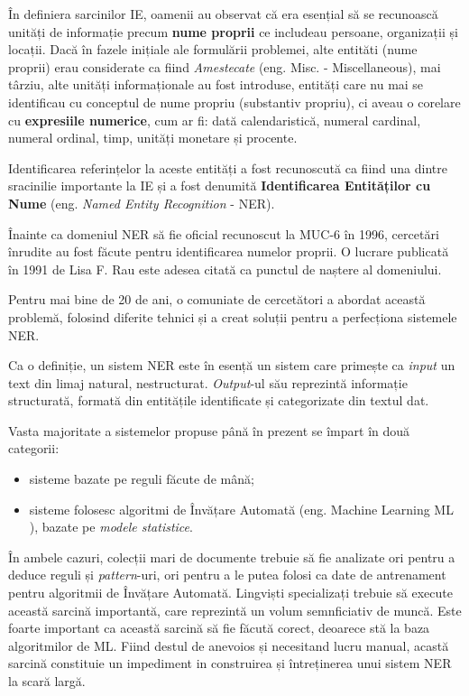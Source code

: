 În definiera sarcinilor IE, oamenii au observat că era esențial să se recunoască unități de informație precum \textbf{nume proprii} ce includeau persoane, organizații și locații. Dacă în fazele inițiale ale formulării problemei, alte entităti (nume proprii) erau considerate ca fiind \textit{Amestecate} (eng. Misc. - Miscellaneous), mai târziu, alte unități informaționale au fost introduse, entități care nu mai se identificau cu conceptul de nume propriu (substantiv propriu), ci aveau o corelare cu \textbf{expresiile numerice}, cum ar fi: dată calendaristică, numeral cardinal, numeral ordinal, timp, unități monetare și procente.


Identificarea referințelor la aceste entități a fost recunoscută ca fiind una dintre sracinilie importante la IE și a fost denumită \textbf{Identificarea Entităților cu Nume} (eng. \textit{Named Entity Recognition} - NER).


Înainte ca domeniul NER să fie oficial recunoscut la MUC-6 în 1996, cercetări înrudite au fost făcute pentru identificarea numelor proprii. O lucrare publicată în 1991 de Lisa F. Rau este adesea citată ca punctul de naștere al domeniului.\cite{rau1991}

Pentru mai bine de 20 de ani, o comuniate de cercetători a abordat această problemă, folosind diferite tehnici și a creat soluții pentru a perfecționa sistemele NER.

Ca o definiție, un sistem NER este în esență un sistem care primește ca \textit{input} un text din limaj natural, nestructurat. \textit{Output}-ul său reprezintă informație structurată, formată din entitățile identificate și categorizate din textul dat.

Vasta majoritate a sistemelor propuse până în prezent se împart în două categorii:

\begin{itemize}
\item sisteme bazate pe reguli făcute de mână;
\item sisteme folosesc algoritmi de Învățare Automată (eng. Machine Learning ML ), bazate pe \textit{modele statistice}.
\end{itemize}


În ambele cazuri, colecții mari de documente trebuie să fie analizate ori pentru a deduce reguli și \textit{pattern}-uri, ori pentru a le putea folosi ca date  de antrenament pentru algoritmii de Învățare Automată. Lingviști specializați trebuie să execute această sarcină importantă, care reprezintă un volum semnficiativ de muncă. Este foarte important ca această sarcină să fie făcută corect, deoarece stă la baza algoritmilor de ML. Fiind destul de anevoios și necesitand lucru manual, acastă sarcină constituie un impediment in construirea și întreținerea unui sistem NER la scară largă.

